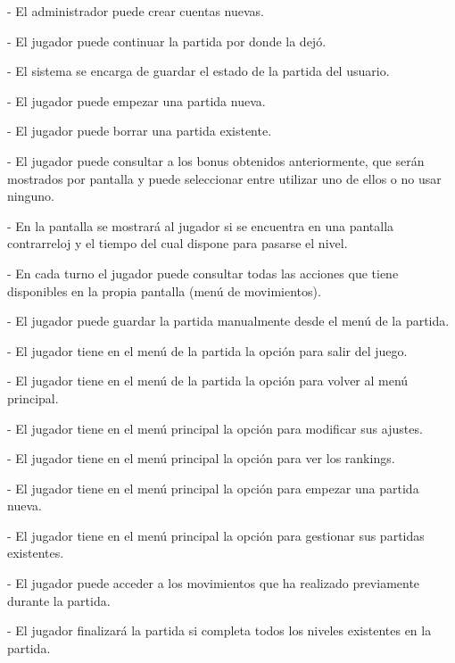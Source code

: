 -	El administrador puede crear cuentas nuevas.

-	El jugador puede continuar la partida por donde la dejó.

-	El sistema se encarga de guardar el estado de la partida del usuario.

-	El jugador puede empezar una partida nueva.

-	El jugador puede borrar una partida existente.

-	El jugador puede consultar a los bonus obtenidos anteriormente, que serán mostrados por pantalla y puede seleccionar entre utilizar uno de ellos o no usar ninguno.

-	En la pantalla se mostrará al jugador si se encuentra en una pantalla contrarreloj y el tiempo del cual dispone para pasarse el nivel.

-	En cada turno el jugador puede consultar todas las acciones que tiene disponibles en la propia pantalla (menú de movimientos).

-	El jugador puede guardar la partida manualmente desde el menú de la partida.

-	El jugador tiene en el menú de la partida la opción para salir del juego.

-	El jugador tiene en el menú de la partida la opción para volver al menú principal.

-	El jugador tiene en el menú principal la opción para modificar sus ajustes.

-	El jugador tiene en el menú principal la opción para ver los rankings.

-	El jugador tiene en el menú principal la opción para empezar una partida nueva.

-	El jugador tiene en el menú principal la opción para gestionar sus partidas existentes.

-         El jugador puede acceder a los movimientos que ha realizado previamente durante la partida.

-	El jugador finalizará la partida si completa todos los niveles existentes en la partida.

